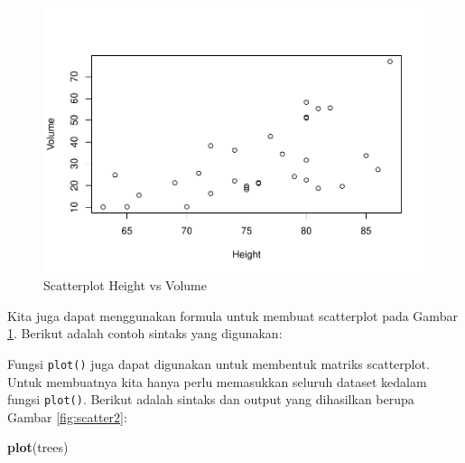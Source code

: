 \documentclass[]{book}
\newenvironment{Shaded}{\begin{snugshade}}{\end{snugshade}}
\newcommand{\KeywordTok}[1]{\textcolor[rgb]{0.13,0.29,0.53}{\textbf{#1}}}
\newcommand{\StringTok}[1]{\textcolor[rgb]{0.31,0.60,0.02}{#1}}
\newcommand{\OperatorTok}[1]{\textcolor[rgb]{0.81,0.36,0.00}{\textbf{#1}}}
\newcommand{\NormalTok}[1]{#1}
\begin{document}
\begin{figure}

{\centering \includegraphics[width=0.7\linewidth]{EnvStat_files/figure-latex/scatter-1} 

}

\caption{Scatterplot Height vs Volume}\label{fig:scatter}
\end{figure}

Kita juga dapat menggunakan formula untuk membuat scatterplot pada
Gambar \ref{fig:scatter}. Berikut adalah contoh sintaks yang digunakan:

\begin{Shaded}
\end{Shaded}

Fungsi \texttt{plot()} juga dapat digunakan untuk membentuk matriks
scatterplot. Untuk membuatnya kita hanya perlu memasukkan seluruh
dataset kedalam fungsi \texttt{plot()}. Berikut adalah sintaks dan
output yang dihasilkan berupa Gambar \ref{fig:scatter2}:

\begin{Shaded}
\begin{Highlighting}[]
\KeywordTok{plot}\NormalTok{(trees)}
\end{Highlighting}
\end{Shaded}
\end{document}
